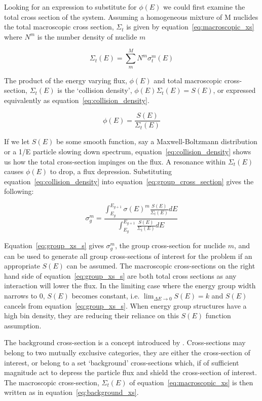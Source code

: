 Looking for an expression to substitute for $\phi(E)$ we could first examine the total cross section of the system. Assuming a homogeneous mixture of M nuclides the total macroscopic cross section, $\Sigma_{t}$ is given by equation~\ref{eq:macroscopic_xs} where $N^{m}$ is the number density of nuclide $m$

\begin{equation}
  \label{eq:macroscopic_xs}
  \Sigma_{t}(E) = \sum_{m}^{M} N^{m} \sigma_{t}^{m}(E)
\end{equation}

The product of the energy varying flux, $\phi(E)$ and total macroscopic cross-section, $\Sigma_{t}(E)$ is the `collision density', $\phi(E) \Sigma_{t}(E) = S(E)$, or expressed equivalently as equation~\ref{eq:collision_density}.

\begin{equation}
  \label{eq:collision_density}
  \phi(E) = \frac{S(E)}{\Sigma_{t}(E)}
\end{equation}

If we let $S(E)$ be some smooth function, say a Maxwell-Boltzmann distribution or a 1/E particle slowing down spectrum, equation~\ref{eq:collision_density} shows us how the total cross-section impinges on the flux. A resonance within $\Sigma_{t}(E)$ causes $\phi(E)$ to drop, a flux depression. Substituting equation~\ref{eq:collision_density} into equation~\ref{eq:group_cross_section} gives the following:

\begin{equation}
  \label{eq:group_xs_s}
  \sigma_{g}^{m} = \frac{\int_{E_{g}}^{E_{g+1}} \sigma(E)^{m} \frac{S(E)}{\Sigma_{t}(E)} dE}{\int_{E_{g}}^{E_{g+1}} \frac{S(E)}{\Sigma_{t}(E)} dE}
\end{equation}

Equation~\ref{eq:group_xs_s} gives $\sigma_{g}^{m}$, the group cross-section for nuclide $m$, and can be used to generate all group cross-sections of interest for the problem if an appropriate $S(E)$ can be assumed. The macroscopic cross-sections on the right hand side of equation~\ref{eq:group_xs_s} are both total cross sections as any interaction will lower the flux. In the limiting case where the energy group width narrows to 0, $S(E)$ becomes constant, i.e. $\lim_{\Delta E \to 0} S(E) = k$ and $S(E)$ cancels from equation~\ref{eq:group_xs_s}. When energy group structures have a high bin density, they are reducing their reliance on this $S(E)$ function assumption.

The background cross-section is a concept introduced by \citeauthor{Bondarenko1964}. Cross-sections may belong to two mutually exclusive categories, they are either the cross-section of interest, or belong to a set `background' cross-sections which, if of sufficient magnitude act to depress the particle flux and shield the cross-section of interest. The macroscopic cross-section, $\Sigma_{t}(E)$ of equation~\ref{eq:macroscopic_xs} is then written as in equation~\ref{eq:background_xs}.

